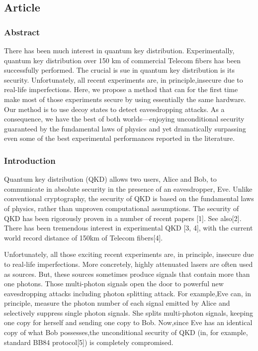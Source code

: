 \subsection{Article}

\subsubsection*{Abstract}

There has been much interest in quantum key distribution. Experimentally, quantum key distribution over 150 km of commercial Telecom fibers has been successfully performed. The crucial is sue in quantum key distribution is its security. Unfortunately, all recent experiments are, in principle,insecure due to real-life imperfections. Here, we propose a method that can for the first time make most of those experiments secure by using essentially the same hardware. Our method is to use decoy states to detect eavesdropping attacks. As a consequence, we have the best of both worlds—enjoying unconditional security guaranteed by the fundamental laws of physics and yet dramatically surpassing even some of the best experimental performances reported in the literature.

\subsubsection{Introduction}

Quantum key distribution (QKD) allows two users, Alice and Bob, to communicate in absolute security in the presence of an eavesdropper, Eve. Unlike conventional cryptography, the security of QKD is based on the fundamental laws of physics, rather than unproven computational assumptions. The security of QKD has been rigorously proven in a number of recent papers [1]. See also[2]. There has been tremendous interest in experimental QKD [3, 4], with the current world record distance of 150km of Telecom fibers[4].

Unfortunately, all those exciting recent experiments are, in principle, insecure due to real-life imperfections.
More concretely, highly attenuated lasers are often used as sources. But, these sources sometimes produce signals that contain more than one photons. Those multi-photon signals open the door to powerful new eavesdropping attacks including photon splitting attack. For example,Eve can, in principle, measure the photon number of each signal emitted by Alice and selectively suppress single photon signals. She splits multi-photon signals, keeping one copy for herself and sending one copy to Bob. Now,since Eve has an identical copy of what Bob possesses,the unconditional security of QKD (in, for example, standard BB84 protocol[5]) is completely compromised.

